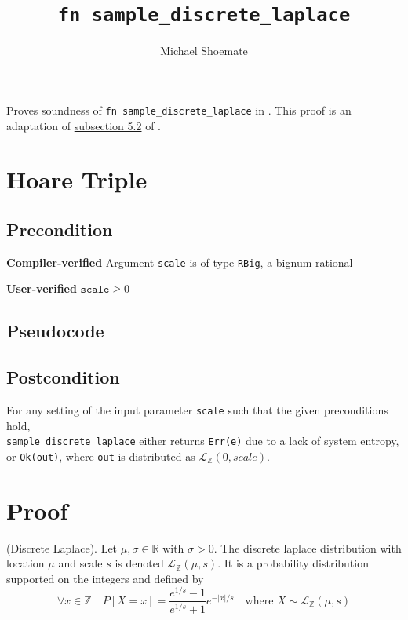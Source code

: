 \documentclass{article}
\title{\texttt{fn sample\_discrete\_laplace}}
\author{Michael Shoemate}
\begin{document}
 
\maketitle 
 
Proves soundness of \texttt{fn sample\_discrete\_laplace} in . 
This proof is an adaptation of \href{https://arxiv.org/pdf/2004.00010.pdf#subsection.5.2}{subsection 5.2} of \cite{CKS20}. 
 
\section{Hoare Triple} 
\subsection*{Precondition} 
\textbf{Compiler-verified} 
Argument \texttt{scale} is of type \texttt{RBig}, a bignum rational 
 
\textbf{User-verified} 
$\texttt{scale} \geq 0$ 
 
\subsection*{Pseudocode}         
 
 
\subsection*{Postcondition} 
\label{postcondition} 
For any setting of the input parameter \texttt{scale} such that the given preconditions hold, \\ 
\texttt{sample\_discrete\_laplace} either returns \texttt{Err(e)} due to a lack of system entropy, 
or \texttt{Ok(out)}, where \texttt{out} is distributed as $\mathcal{L}_\mathbb{Z}(0, scale)$. 
 
\section{Proof} 
\begin{definition} \cite{BV17} 
    (Discrete Laplace). Let $\mu, \sigma \in \mathbb{R}$ with $\sigma > 0$.  
    The discrete laplace distribution with location $\mu$ and scale $s$ is denoted $\mathcal{L}_\mathbb{Z}(\mu, s)$.  
    It is a probability distribution supported on the integers and defined by 
    \begin{equation*} 
        \forall x \in \mathbb{Z} \quad  P[X = x] = \frac{e^{1/s} - 1}{e^{1/s} + 1} e^{-|x|/s} \quad \text{where } X \sim \mathcal{L}_\mathbb{Z}(\mu, s) 
    \end{equation*} 
\end{definition} 
 
\end{document}
